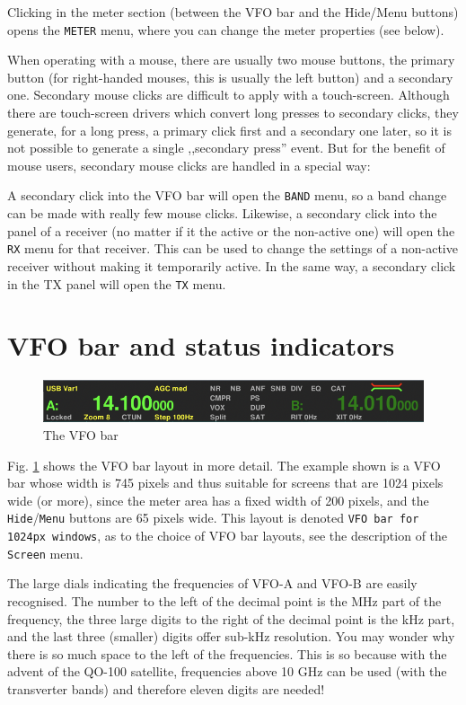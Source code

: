\documentclass[12pt]{book}
\def\rett#1{\texttt{\color{red}#1}}
\def\bltt#1{\texttt{\color{blue}#1}}
\begin{document}
Clicking in the meter section (between the VFO bar and the
Hide/Menu buttons) opens the \bltt{METER} menu, where
you can change the meter properties (see below).

When operating with a mouse, there are usually two mouse buttons,
the primary button (for right-handed mouses, this is usually
the left button) and a secondary one. Secondary mouse clicks
are difficult to apply with a touch-screen. Although there are
touch-screen drivers which convert long presses to secondary clicks,
they generate, for a long press, a primary click first and a
secondary one later, so it is not possible to generate a
single ,,secondary press'' event. But for the benefit of
mouse users, secondary mouse clicks are handled in a special way:

A secondary click into the VFO bar will open the \bltt{BAND} menu,
so a band change can be made with really few mouse clicks. Likewise,
a secondary click into the panel of a receiver (no matter if it
the active or the non-active one) will open the \bltt{RX} menu
for that receiver. This can be used to change the settings of a
non-active receiver without making it temporarily active. In the
same way, a secondary click in the TX panel will open the
\bltt{TX} menu.

\section{VFO bar and status  indicators}
\label{sec:VFObar}
\begin{figure}[ht]
\center
\includegraphics[width=12cm]{VFObar.png}
\caption{The VFO bar}
\label{fig:VFObar}
\end{figure}

Fig. \ref{fig:VFObar} shows the VFO bar layout in more  detail.
The example shown is a VFO bar whose width is 745 pixels and
thus suitable for screens that are 1024 pixels wide (or more),
since the meter area has a fixed width of 200 pixels, and
the \rett{Hide}/\rett{Menu} buttons are 65 pixels wide. This layout is
denoted \texttt{VFO bar for 1024px windows}, as to the choice
of VFO bar layouts, see the description of the \bltt{Screen} menu.

The large dials indicating the frequencies of VFO-A and VFO-B
are easily recognised. The number to the left of the decimal
point is the MHz part of the frequency, the three  large digits
to the right  of  the decimal point is the kHz part, and
the last three (smaller) digits offer sub-kHz resolution.
You may wonder why there is  so much space to the left of
the frequencies. This is so because with the advent of
the QO-100 satellite, frequencies above 10 GHz can be
used (with the transverter bands) and therefore eleven
digits are needed!
\end{document}
